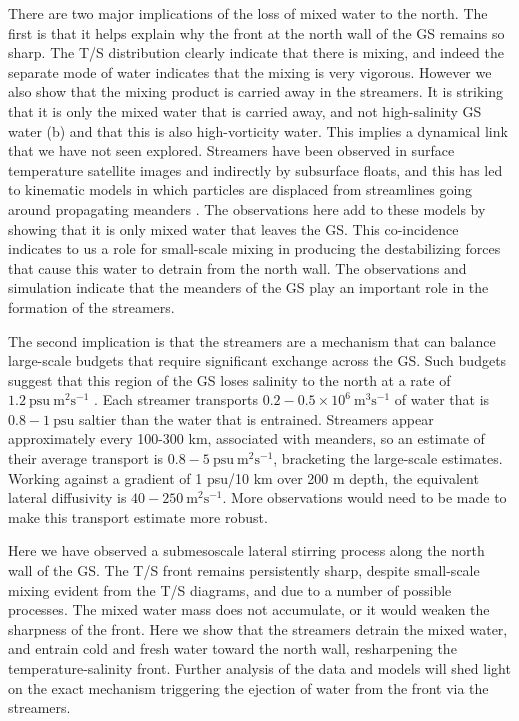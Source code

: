 \documentclass{natureJMK}
\begin{document}
There are two major implications of the loss of  mixed water to the north.  The first is that it helps explain why the front at the north wall of the GS remains so sharp.  The T/S distribution clearly indicate that there is mixing, and indeed the separate mode of water indicates that the mixing is very vigorous.  However we also show that the mixing product is carried away in the streamers.  It is striking that it is only the mixed water that is carried away, and not high-salinity GS water (b) and that this is also high-vorticity water.  This implies a dynamical link that we have not seen explored.  Streamers have been observed in surface temperature  satellite images and indirectly by subsurface floats\cite{bowerrossby89,flierletal87,lozieretal97,songetal95}, and this has led to kinematic models in which particles are displaced from streamlines going around propagating meanders \cite{bower91,prattetal95,lozieretal97}. The observations here add to these models by showing that it is only mixed water that leaves the GS.  This co-incidence indicates to us a role for small-scale mixing in producing the destabilizing forces that cause this water to detrain from the north wall.  The observations and simulation indicate that the meanders of the GS play an important role in the formation of the streamers.

The second implication is that the streamers are a mechanism that can balance large-scale budgets that require significant exchange across the GS\cite{joyceetal13,boweretal85}. Such budgets suggest that this region of the GS loses salinity to the north at a rate of $1.2\ \mathrm{psu\  m^2 s^{-1}}$ \cite{joyceetal13}.  Each streamer transports $0.2-0.5 \times 10^6\ \mathrm{m^3 s^{-1}}$ of water that is $0.8-1\ \mathrm{psu}$ saltier than the water that is entrained.  Streamers appear approximately every 100-300 km, associated with meanders, so an estimate of their average transport is $0.8-5\ \mathrm{psu\ m^2s^{-1}}$, bracketing the large-scale estimates.  Working against a gradient of 1 psu/10 km over 200 m depth, the equivalent lateral diffusivity is $40-250\ \mathrm{m^2s^{-1}}$. More observations would need to be made to make this transport estimate more robust.

Here we have observed a submesoscale lateral stirring process along the north wall of the GS.  The T/S front remains persistently sharp, despite small-scale mixing evident from the T/S diagrams, and due to a number of possible processes\cite{thomasshakespeare15,whittthomas13}. The mixed water mass does not accumulate, or it would weaken the sharpness of the front. Here we show that the streamers detrain the  mixed water, and entrain cold and fresh water toward the north wall, resharpening the temperature-salinity front. Further analysis of the data and models will shed light on the exact mechanism triggering the ejection of water from the front via the streamers.
\end{document}
